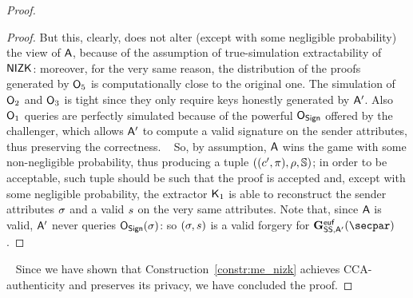 \begin{proof}
\begin{lemma}
\begin{proof}
            But this, clearly, does not alter (except with some negligible probability) the view of $\mathsf{A}$, because of the assumption of true-simulation extractability of $\mathsf{NIZK}$: moreover, for the very same reason, the distribution of the proofs generated by $\mathsf{O}_5$ is computationally close to the original one.
            The simulation of $\mathsf{O}_2$ and $\mathsf{O}_3$ is tight since they only require keys honestly generated by $\mathsf{A}'$.
            Also $\mathsf{O}_1$ queries are perfectly simulated because of the powerful $\mathsf{O}_{\mathsf{Sign}}$ offered by the challenger, which allows $\mathsf{A}'$ to compute a valid signature on the sender attributes, thus preserving the correctness.
            ~\newline\newline
            So, by assumption, $\mathsf{A}$ wins the game with some non-negligible probability, thus producing a tuple $((c', \pi), \rho, \mathbb{S})$; in order to be acceptable, such tuple should be such that the proof is accepted and, except with some negligible probability, the extractor $\mathsf{K}_1$ is able to reconstruct the sender attributes $\sigma$ and a valid $s$ on the very same attributes.
            Note that, since $\mathsf{A}$ is valid, $\mathsf{A}'$ never queries $\mathsf{O}_{\mathsf{Sign}}(\sigma)$: so $(\sigma, s)$ is a valid forgery for $\Sigeufgame_{\sig, \adversary'}(\secpar)$.
        \end{proof}
    \end{lemma}
    ~\newline
    Since we have shown that Construction~\ref{constr:me_nizk} achieves CCA-authenticity and preserves its privacy, we have concluded the proof.
\end{proof}
